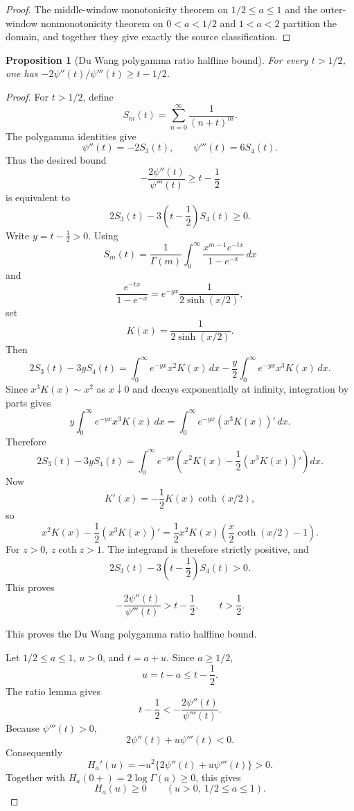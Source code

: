 \documentclass[11pt]{article}
\numberwithin{equation}{section}
\newtheorem{proposition}[theorem]{Proposition}
\theoremstyle{definition}
\theoremstyle{remark}
\newcommand{\1}{\mathbf 1}
\begin{document}
\begin{proof}
The middle-window monotonicity theorem on \(1/2\le a\le1\) and the outer-window nonmonotonicity theorem on \(0<a<1/2\) and \(1<a<2\) partition the domain, and together they give exactly the source classification.
\end{proof}

\begin{proposition}[Du Wang polygamma ratio halfline bound]
\label{res:du-wang-polygamma-ratio-halfline-bound}
For every \(t>1/2\), one has \(-2\psi''(t)/\psi'''(t)\ge t-1/2\).
\end{proposition}

\begin{proof}
For \(t>1/2\), define
\[
S_m(t)=\sum_{n=0}^{\infty}\frac1{(n+t)^m}.
\]
The polygamma identities give
\[
\psi''(t)=-2S_3(t),\qquad \psi'''(t)=6S_4(t).
\]
Thus the desired bound
\[
-\frac{2\psi''(t)}{\psi'''(t)}\ge t-\frac12
\]
is equivalent to
\[
2S_3(t)-3\left(t-\frac12\right)S_4(t)\ge0.
\]
Write \(y=t-\frac12>0\).  Using
\[
S_m(t)=\frac1{\Gamma(m)}
\int_0^\infty \frac{x^{m-1}e^{-tx}}{1-e^{-x}}\,dx
\]
and
\[
\frac{e^{-tx}}{1-e^{-x}}
=e^{-yx}\frac1{2\sinh(x/2)},
\]
set
\[
K(x)=\frac1{2\sinh(x/2)}.
\]
Then
\[
2S_3(t)-3yS_4(t)
=
\int_0^\infty e^{-yx}x^2K(x)\,dx
-\frac y2\int_0^\infty e^{-yx}x^3K(x)\,dx.
\]
Since \(x^3K(x)\sim x^2\) as \(x\downarrow0\) and decays exponentially at
infinity, integration by parts gives
\[
y\int_0^\infty e^{-yx}x^3K(x)\,dx
=
\int_0^\infty e^{-yx}(x^3K(x))'\,dx.
\]
Therefore
\[
2S_3(t)-3yS_4(t)
=
\int_0^\infty e^{-yx}
\left(x^2K(x)-\frac12(x^3K(x))'\right)dx.
\]
Now
\[
K'(x)=-\frac12K(x)\coth(x/2),
\]
so
\[
x^2K(x)-\frac12(x^3K(x))'
=
\frac12x^2K(x)\left(\frac x2\coth(x/2)-1\right).
\]
For \(z>0\), \(z\coth z>1\).  The integrand is therefore strictly positive,
and
\[
2S_3(t)-3\left(t-\frac12\right)S_4(t)>0.
\]
This proves
\[
-\frac{2\psi''(t)}{\psi'''(t)}>t-\frac12,
\qquad t>\frac12.
\]

This proves the Du Wang polygamma ratio halfline bound.

Let \(1/2\le a\le1\), \(u>0\), and \(t=a+u\).  Since \(a\ge1/2\),
\[
u=t-a\le t-\frac12.
\]
The ratio lemma gives
\[
t-\frac12<-\frac{2\psi''(t)}{\psi'''(t)}.
\]
Because \(\psi'''(t)>0\),
\[
2\psi''(t)+u\psi'''(t)<0.
\]
Consequently
\[
H_a'(u)=-u^2\{2\psi''(t)+u\psi'''(t)\}>0.
\]
Together with \(H_a(0+)=2\log\Gamma(a)\ge0\), this gives
\[
H_a(u)\ge0
\qquad (u>0,\ 1/2\le a\le1).
\]


\end{proof}
\end{document}
